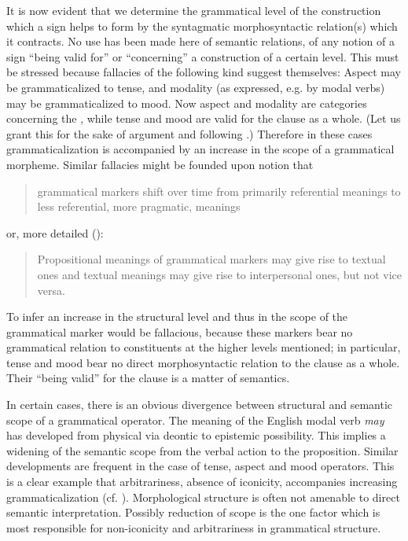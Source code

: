 It is now evident that we determine the grammatical level of the construction which a sign helps to form by the syntagmatic morphosyntactic relation(s) which it contracts. No use has been made here of semantic relations, of any notion of a sign “being valid for” or “concerning” a construction of a certain level. This must be stressed because fallacies of the following kind suggest themselves: Aspect may be grammaticalized to tense, and modality (as expressed, e.g. by modal verbs) may be grammaticalized to mood. Now aspect and modality are categories concerning the \vp, while tense and mood are valid for the clause as a whole. (Let us grant this for the sake of argument and following \citealt[7]{Bazell1949}.) Therefore in these cases grammaticalization is accompanied by an increase in the scope of a grammatical morpheme. Similar fallacies might be founded upon \citet[47]{Traugott1980} notion that

\begin{quote}
grammatical markers shift over time from primarily referential meanings to less referential, more pragmatic, meanings
\end{quote}

\noindent or, more detailed (\citeyear[47]{Traugott1980}):

\begin{quote}
Propositional meanings of grammatical markers may give rise to textual ones and textual meanings may give rise to interpersonal ones, but not vice versa.
\end{quote}

\noindent To infer an increase in the structural level and thus in the scope of the grammatical marker would be fallacious, because these markers bear no grammatical relation to constituents at the higher levels mentioned; in particular, tense and mood bear no direct morphosyntactic relation to the clause as a whole. Their “being valid” for the clause is a matter of semantics.

In certain cases, there is an obvious divergence between structural and semantic scope of a grammatical operator. The meaning of the English modal verb \textit{may} has developed from physical via deontic to epistemic possibility. This implies a widening of the semantic scope from the verbal action to the proposition. Similar developments are frequent in the case of tense, aspect and mood operators. This is a clear example that arbitrariness, absence of iconicity, accompanies increasing grammaticalization (cf. ). Morphological structure is often not amenable to direct semantic interpretation. Possibly reduction of scope is the one factor which is most responsible for non-iconicity and arbitrariness in grammatical structure.

